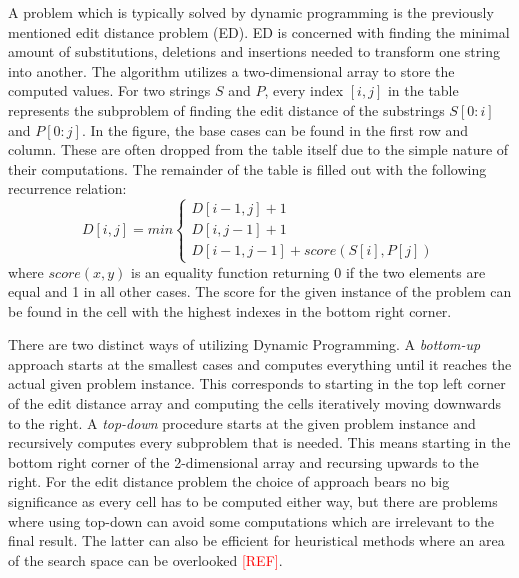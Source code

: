 \documentclass[thesis.tex]{subfiles}
\begin{document}
A problem which is typically solved by dynamic programming is the previously mentioned edit distance problem (ED). ED is concerned with finding the minimal amount of substitutions, deletions and insertions needed to transform one string into another. The algorithm utilizes a two-dimensional array to store the computed values. For two strings $S$ and $P$, every index $[i,j]$ in the table represents the subproblem of finding the edit distance of the substrings $S[0:i]$ and $P[0:j]$. 
\clearpage\noindent
In the figure, the base cases can be found in the first row and column. These are often dropped from the table itself due to the simple nature of their computations. The remainder of the table is filled out with the following recurrence relation:
\begin{equation}
  D[i,j] = min
  \begin{cases}
    D[i-1,j] + 1\\
    D[i,j-1] + 1\\
    D[i-1,j-1] + score(S[i], P[j])
  \end{cases}
  \label{eq:ed_recurrence_relation}
\end{equation}
where $score(x, y)$ is an equality function returning 0 if the two elements are equal and 1 in all other cases. The score for the given instance of the problem can be found in the cell with the highest indexes in the bottom right corner.\\
\par\noindent
There are two distinct ways of utilizing Dynamic Programming. A \textit{bottom-up} approach starts at the smallest cases and computes everything until it reaches the actual given problem instance. This corresponds to starting in the top left corner of the edit distance array and computing the cells iteratively moving downwards to the right. A \textit{top-down} procedure starts at the given problem instance and recursively computes every subproblem that is needed. This means starting in the bottom right corner of the 2-dimensional array and recursing upwards to the right. For the edit distance problem the choice of approach bears no big significance as every cell has to be computed either way, but there are problems where using top-down can avoid some computations which are irrelevant to the final result. The latter can also be efficient for heuristical methods where an area of the search space can be overlooked \textcolor{red}{[REF]}.
\end{document}
